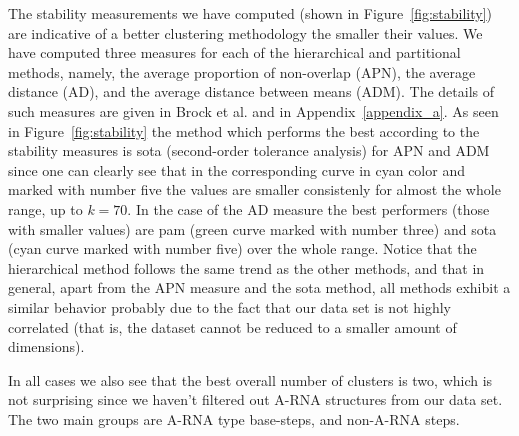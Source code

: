 The    stability   measurements   we    have   computed    (shown   in
Figure~\ref{fig:stability})  are  indicative  of a  better  clustering
methodology the smaller their values.  We have computed three measures
for  each of  the hierarchical  and partitional  methods,  namely, the
average proportion  of non-overlap  (APN), the average  distance (AD),
and the  average distance  between means (ADM).   The details  of such
measures  are   given  in  Brock  et  al.    \cite{brock2008}  and  in
Appendix~\ref{appendix_a}.  As  seen in Figure~\ref{fig:stability} the
method which performs the best  according to the stability measures is
sota (second-order tolerance  analysis) for APN and ADM  since one can
clearly see that  in the corresponding curve in  cyan color and marked
with number  five the  values are smaller  consistenly for  almost the
whole range,  up to $k=70$.   In the case  of the AD measure  the best
performers  (those with smaller  values) are  pam (green  curve marked
with number three) and sota  (cyan curve marked with number five) over
the whole range.  Notice that the hierarchical method follows the same
trend as  the other methods, and  that in general, apart  from the APN
measure and  the sota method,  all methods exhibit a  similar behavior
probably due  to the fact that  our data set is  not highly correlated
(that  is,  the dataset  cannot  be reduced  to  a  smaller amount  of
dimensions).

In all cases  we also see that the best overall  number of clusters is
two,  which is  not surprising  since  we haven't  filtered out  A-RNA
structures  from our  data set.  The two  main groups  are  A-RNA type
base-steps, and non-A-RNA steps.

